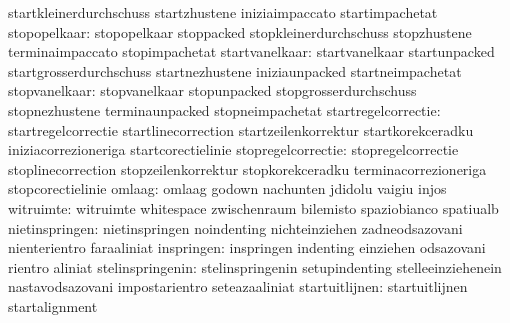                                   startkleinerdurchschuss          startzhustene
                                  iniziaimpaccato                  startimpachetat
                    stopopelkaar: stopopelkaar                     stoppacked
                                  stopkleinerdurchschuss           stopzhustene
                                  terminaimpaccato                 stopimpachetat
                  startvanelkaar: startvanelkaar                   startunpacked
                                  startgrosserdurchschuss          startnezhustene
                                  iniziaunpacked                   startneimpachetat
                   stopvanelkaar: stopvanelkaar                    stopunpacked
                                  stopgrosserdurchschuss           stopnezhustene
                                  terminaunpacked                  stopneimpachetat
             startregelcorrectie: startregelcorrectie              startlinecorrection
                                  startzeilenkorrektur             startkorekceradku
                                  iniziacorrezioneriga             startcorectielinie
              stopregelcorrectie: stopregelcorrectie               stoplinecorrection
                                  stopzeilenkorrektur              stopkorekceradku
                                  terminacorrezioneriga            stopcorectielinie
                          omlaag: omlaag                           godown
                                  nachunten                        jdidolu
                                  vaigiu                           injos
                       witruimte: witruimte                        whitespace
                                  zwischenraum                     bilemisto
                                  spaziobianco                     spatiualb
                  nietinspringen: nietinspringen                   noindenting
                                  nichteinziehen                   zadneodsazovani
                                  nienterientro                    faraaliniat
                      inspringen: inspringen                       indenting
                                  einziehen                        odsazovani
                                  rientro                          aliniat
                stelinspringenin: stelinspringenin                 setupindenting
                                  stelleeinziehenein               nastavodsazovani
                                  impostarientro                   seteazaaliniat
                  startuitlijnen: startuitlijnen                   startalignment
